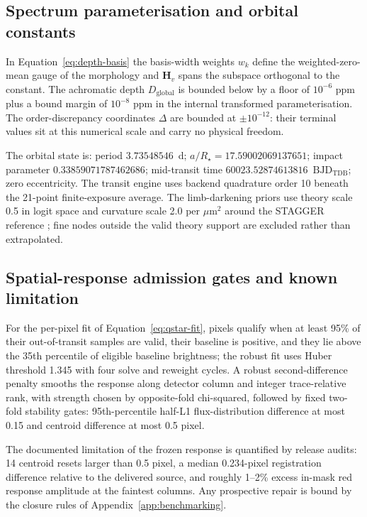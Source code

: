 \subsection{Spectrum parameterisation and orbital constants}

In Equation~\ref{eq:depth-basis} the basis-width weights $w_k$ define the
weighted-zero-mean gauge of the morphology and $\bm{H}_v$ spans the
subspace orthogonal to the constant. The achromatic depth
$D_{\mathrm{global}}$ is bounded below by a floor of $10^{-6}$ ppm plus a
bound margin of $10^{-8}$ ppm in the internal transformed
parameterisation. The order-discrepancy coordinates $\Delta$ are bounded
at $\pm 10^{-12}$: their terminal values sit at this numerical scale and
carry no physical freedom.

The orbital state is: period $3.73548546$~d;
$a/R_\star=17.59002069137651$; impact parameter $0.33859071787462686$;
mid-transit time $60023.52874613816$~$\mathrm{BJD_{TDB}}$; zero
eccentricity. The transit engine uses backend quadrature order 10 beneath
the 21-point finite-exposure average. The limb-darkening priors use
theory scale 0.5 in logit space and curvature scale 2.0 per
$\mu\mathrm{m}^2$ around the STAGGER reference \citep{MagicEtAl2015};
fine nodes outside the valid theory support are excluded rather than
extrapolated.

\subsection{Spatial-response admission gates and known limitation}

For the per-pixel fit of Equation~\ref{eq:qstar-fit}, pixels qualify when
at least 95\% of their out-of-transit samples are valid, their baseline is
positive, and they lie above the 35th percentile of eligible baseline
brightness; the robust fit uses Huber threshold 1.345 with four solve and
reweight cycles. A robust second-difference penalty smooths the response
along detector column and integer trace-relative rank, with strength
chosen by opposite-fold chi-squared, followed by fixed two-fold stability
gates: 95th-percentile half-L1 flux-distribution difference at most 0.15
and centroid difference at most 0.5 pixel.

The documented limitation of the frozen response is quantified by release
audits: 14 centroid resets larger than 0.5 pixel, a median 0.234-pixel
registration difference relative to the delivered source, and roughly
1--2\% excess in-mask red response amplitude at the faintest columns. Any
prospective repair is bound by the closure rules of
Appendix~\ref{app:benchmarking}.

